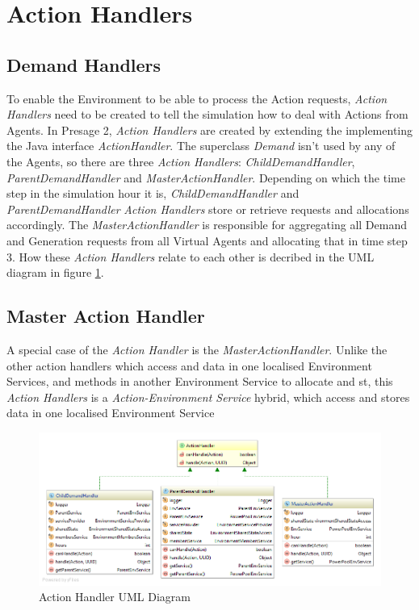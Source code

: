 \section*{Action Handlers} %
\subsection*{Demand Handlers}
To enable the Environment to be able to process the Action requests, \textit{Action Handlers} need to be created to tell the simulation how to deal with Actions from Agents. In Presage 2, \textit{Action Handlers} are created by extending the implementing the Java interface \textit{ActionHandler}. The superclass \textit{Demand} isn't used by any of the Agents, so there are three \textit{Action Handlers}:  \textit{ChildDemandHandler}, \textit{ParentDemandHandler} and \textit{MasterActionHandler}. Depending on which the time step in the simulation hour it is, \textit{ChildDemandHandler} and \textit{ParentDemandHandler} \textit{Action Handlers} store or retrieve requests and allocations accordingly. The \textit{MasterActionHandler} is responsible for aggregating all Demand and Generation requests from all Virtual Agents and allocating that in time step 3. How these \textit{Action Handlers} relate to each other is decribed in the UML diagram in figure \ref{fig:ActionHandlerUML}. 

\subsection*{Master Action Handler}
A special case of the \textit{Action Handler} is the \textit{MasterActionHandler}. Unlike the other action handlers which access and data in one localised Environment Services, and methods in another Environment Service to allocate and st, this \textit{Action Handlers} is a \textit{Action-Environment Service} hybrid, which access and stores data in one localised Environment Service

\begin{figure}[!h]
	\centering
	\includegraphics[scale=0.4]{Images/ActionHandlerUML.png}
	\caption{Action Handler UML Diagram}
	\label{fig:ActionHandlerUML}
\end{figure}

